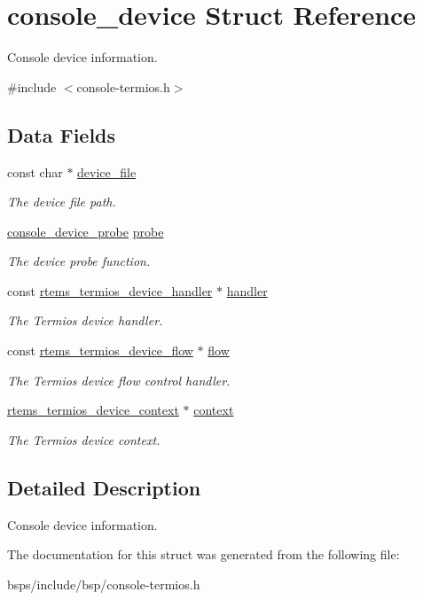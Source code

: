 \hypertarget{structconsole__device}{}\section{console\+\_\+device Struct Reference}
\label{structconsole__device}


Console device information.  




{\ttfamily \#include $<$console-\/termios.\+h$>$}

\subsection*{Data Fields}
\begin{DoxyCompactItemize}
\item 
const char $\ast$ \mbox{\hyperlink{group__ConsoleTermios_ga0e92b47597259fb578d5a651d91255ea}{device\+\_\+file}}
\begin{DoxyCompactList}\small\item\em The device file path. \end{DoxyCompactList}\item 
\mbox{\hyperlink{group__ConsoleTermios_ga256c0a60dec13fd909e708ca271de6f1}{console\+\_\+device\+\_\+probe}} \mbox{\hyperlink{group__ConsoleTermios_ga986b63ec495d64d2c797805eff3cb28b}{probe}}
\begin{DoxyCompactList}\small\item\em The device probe function. \end{DoxyCompactList}\item 
const \mbox{\hyperlink{structrtems__termios__device__handler}{rtems\+\_\+termios\+\_\+device\+\_\+handler}} $\ast$ \mbox{\hyperlink{group__ConsoleTermios_ga2883081a14f477f2a3be297f737269aa}{handler}}
\begin{DoxyCompactList}\small\item\em The Termios device handler. \end{DoxyCompactList}\item 
const \mbox{\hyperlink{structrtems__termios__device__flow}{rtems\+\_\+termios\+\_\+device\+\_\+flow}} $\ast$ \mbox{\hyperlink{group__ConsoleTermios_gaaefe0e8802b5775c4e211a74ccf372ac}{flow}}
\begin{DoxyCompactList}\small\item\em The Termios device flow control handler. \end{DoxyCompactList}\item 
\mbox{\hyperlink{structrtems__termios__device__context}{rtems\+\_\+termios\+\_\+device\+\_\+context}} $\ast$ \mbox{\hyperlink{group__ConsoleTermios_ga3dfebeb03f639f0c27e52128404b7141}{context}}
\begin{DoxyCompactList}\small\item\em The Termios device context. \end{DoxyCompactList}\end{DoxyCompactItemize}


\subsection{Detailed Description}
Console device information. 

The documentation for this struct was generated from the following file\+:\begin{DoxyCompactItemize}
\item 
bsps/include/bsp/console-\/termios.\+h\end{DoxyCompactItemize}
